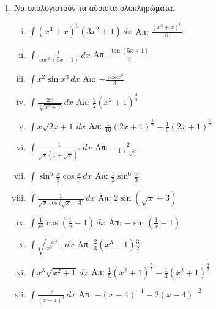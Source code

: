 \begin{enumerate}
  \item Να υπολογιστούν τα αόριστα ολοκληρώματα.
    \begin{enumerate}[i)]
      \item $ \int (x^{3} + x)^{5}(3x^{2} + 1) \,{dx} $ 
        \hfill Απ: $ \frac{ (x^{3} + x)^{6} }{ 6}  $
      \item $ \int \frac{ 1 }{ \cos^{2}{ (5x + 1)} } \,{dx} $ 
        \hfill Απ: $ \frac{\tan{(5x+1)}}{5} $
      \item $ \int x^{2} \sin{x^{3}} \,{dx} $ \hfill Απ: $ - \frac{ \cos{x^{3}}}{ 3 }  $
      \item $ \int \frac{ 2x }{ \sqrt[3]{ x^{2}+ 1 }  } \,{dx} $ 
        \hfill Απ: $ \frac{ 3 }{ 2 } (x^{2} + 1)^{\frac{ 3 }{ 2 }} $
      \item $ \int x \sqrt{ 2x+1 } \,{dx} $ 
        \hfill Απ: $ \frac{1}{ 10 } (2x+1)^{\frac{ 5 }{ 2 }} - 
        \frac{1}{ 6 } (2x+1)^{\frac{ 3 }{ 2 }} $
      \item $ \int \frac{1}{ \sqrt{ x } (1 + \sqrt{ x })^{2} } \,{dx} $ 
        \hfill Απ: $ - \frac{ 2 }{ 1 + \sqrt{ x } } $
      \item $ \int \sin^{5}{\frac{ x }{ 3 } \cos{\frac{ x }{ 3 } }} \,{dx} $ 
        \hfill Απ: $ \frac{1}{ 2 } \sin^{6}{\frac{ x }{ 3 }} $
      \item $ \int \frac{1}{ \sqrt{ x } \cos{(\sqrt{ x } + 3}) } \,{dx} $ 
        \hfill Απ: $ 2 \sin{(\sqrt{ x } + 3)} $
      \item $ \int \frac{1}{ x^{2} } \cos{\left(\frac{1}{ x } - 1\right)} \,{dx} $ 
        \hfill Απ: $ - \sin{\left(\frac{1}{ x } -1\right)} $
      \item $ \int \sqrt{ \frac{ x^{4} }{ x^{3} -1 }  }  \,{dx} $ 
        \hfill Απ: $ \frac{ 2 }{ 3 } (x^{3} - 1){\frac{ 3 }{ 2 }} $
      \item $ \int x^{3} \sqrt{ x^{2} +1}  \,{dx} $ 
        \hfill Απ: $ \frac{ 1 }{ 5 } (x^{2}+1)^{\frac{ 5 }{ 2 }} - 
        \frac{1}{ 3 } (x^{2} + 1)^{\frac{ 3 }{ 2 }}  $
      \item $ \int \frac{ x }{ (x-4)^{3} } \,{dx} $ 
        \hfill Απ: $ -(x-4)^{-1} - 2(x-4)^{-2} $
    \end{enumerate}
\end{enumerate}



